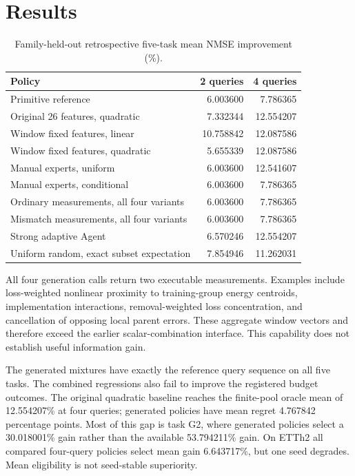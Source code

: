 \documentclass[10pt]{article}
\begin{document}
\section{Results}
\begin{table}[ht]
\centering
\caption{Family-held-out retrospective five-task mean NMSE improvement (\%).}
\begin{tabular}{lrr}
\toprule
Policy & 2 queries & 4 queries\\
\midrule
Primitive reference & 6.003600 & 7.786365\\
Original 26 features, quadratic & 7.332344 & 12.554207\\
Window fixed features, linear & 10.758842 & 12.087586\\
Window fixed features, quadratic & 5.655339 & 12.087586\\
Manual experts, uniform & 6.003600 & 12.541607\\
Manual experts, conditional & 6.003600 & 7.786365\\
Ordinary measurements, all four variants & 6.003600 & 7.786365\\
Mismatch measurements, all four variants & 6.003600 & 7.786365\\
Strong adaptive Agent & 6.570246 & 12.554207\\
Uniform random, exact subset expectation & 7.854946 & 11.262031\\
\bottomrule
\end{tabular}
\end{table}

All four generation calls return two executable measurements.
Examples include loss-weighted nonlinear proximity to training-group energy centroids, implementation interactions, removal-weighted loss concentration, and cancellation of opposing local parent errors.
These aggregate window vectors and therefore exceed the earlier scalar-combination interface.
This capability does not establish useful information gain.

The generated mixtures have exactly the reference query sequence on all five tasks.
The combined regressions also fail to improve the registered budget outcomes.
The original quadratic baseline reaches the finite-pool oracle mean of 12.554207\% at four queries; generated policies have mean regret 4.767842 percentage points.
Most of this gap is task G2, where generated policies select a 30.018001\% gain rather than the available 53.794211\% gain.
On ETTh2 all compared four-query policies select mean gain 6.643717\%, but one seed degrades.
Mean eligibility is not seed-stable superiority.
\end{document}
